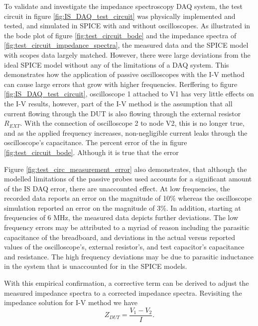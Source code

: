 \par To validate and investigate the impedance spectroscopy DAQ system, the test circuit in figure \ref{fig:IS_DAQ_test_circuit} was physically implemented and tested, and simulated in SPICE with and without oscilloscopes. As illustrated in the bode plot of figure \ref{fig:test_circuit_bode} and the impedance spectra of \ref{fig:test_circuit_impedance_spectra}, the measured data and the SPICE model with scopes data largely matched. However, there were large deviations from the ideal SPICE model without any of the limitations of a DAQ system. This demonstrates how the application of passive oscilloscopes with the I-V method can cause large errors that grow with higher frequencies. Rerffering to figure \ref{fig:IS_DAQ_test_circuit}, oscilloscope 1 attached to V1 has very little effects on the I-V results, however, part of the I-V method is the assumption that all current flowing through the DUT is also flowing through the external resistor $R_{EXT}$. With the connection of oscilloscope 2 to node V2, this is no longer true, and as the applied frequency increases, non-negligible current leaks through the oscilloscope's capacitance. The percent error of the in figure \ref{fig:test_circuit_bode}. Although it is true that the error 

\par Figure \ref{fig:test_circ_measurement_error} also demonstrates, that although the modelled limitations of the passive probes used accounts for a significant amount of the IS DAQ error, there are unaccounted effect. At low frequencies, the recorded data reports an error on the magnitude of 10\% whereas the oscilloscope simulation reported an error on the magnitude of 3\%. In addition, starting at frequencies of 6 MHz, the measured data depicts further deviations. The low frequency errors may be attributed to a myriad of reason including the parasitic capacitance of the breadboard, and deviations in the actual versus reported values of the oscilloscope's, external resistor's, and test capacitor's capacitance and resistance. The high frequency deviations may be due to parasitic inductance in the system that is unaccounted for in the SPICE models.

\par With this empirical confirmation, a corrective term can be derived to adjust the measured impedance spectra to a corrected impedance spectra. Revisiting the impedance solution for I-V method we have 
\begin{equation}
    Z_{DUT} = \frac{V_1 - V_2}{I}.
\end{equation}

